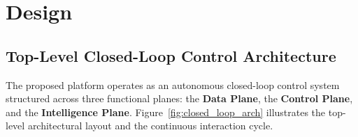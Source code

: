 \documentclass[12pt,a4paper,oneside]{report}
\begin{document}
\section{Design}
\label{sec:design}

\subsection{Top-Level Closed-Loop Control Architecture}
The proposed platform operates as an autonomous closed-loop control system structured across three functional planes: the \textbf{Data Plane}, the \textbf{Control Plane}, and the \textbf{Intelligence Plane}. Figure~\ref{fig:closed_loop_arch} illustrates the top-level architectural layout and the continuous interaction cycle.
\end{document}
